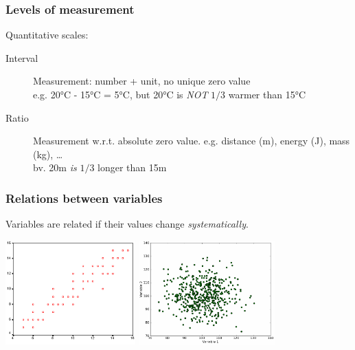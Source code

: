 \documentclass{beamer}
\begin{document}
\begin{frame}
  \frametitle{Levels of measurement}

  Quantitative scales:

  \begin{description}
    \item[Interval] Measurement: number + unit, no unique zero value\\
      e.g. 20°C - 15°C = 5°C, but 20°C is \emph{NOT} $1/3$ warmer than 15°C
    \item[Ratio] Measurement w.r.t. absolute zero value. e.g. distance (m), energy (J), mass (kg), \ldots\\
      bv. 20m \emph{is} $1/3$ longer than 15m
  \end{description}
\end{frame}

\begin{frame}
  \frametitle{Relations between variables}

  Variables are related if their values change \emph{systematically}.

  \begin{center}
    \includegraphics[height=4cm]{img/les1-08a}
    \includegraphics[height=4cm]{img/les1-08b}
  \end{center}
\end{frame}
\end{document}
